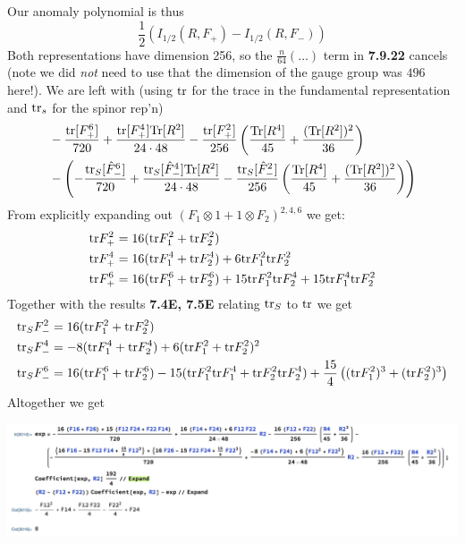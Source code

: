 \documentclass[11pt, class=article, crop=false]{standalone}
\begin{document}
\begin{enumerate}
	Our anomaly polynomial is thus
	\[
		\frac12 (I_{1/2}(R, F_+) - I_{1/2}(R, F_-))
	\]
	Both representations have dimension 256, so the $\frac{n}{64}(\dots)$ term in \textbf{7.9.22} cancels (note we did \emph{not} need to use that the dimension of the gauge group was $496$ here!). We are left with (using $\mathrm{tr}$ for the trace in the fundamental representation and $\mathrm{tr}_s$ for the spinor rep'n)
	\begin{equation}\label{eq:anomaly}
		\begin{aligned}
			&-\frac{\mathrm{tr}[F^6_+]}{720}+ \frac{\mathrm{tr}[F^4_+] \mathrm{Tr}[R^2]}{24 \cdot 48} - \frac{\mathrm{tr}[F^2_+]}{256} \left(\frac{\mathrm{Tr}[R^4]}{45} + \frac{(\mathrm{Tr}[R^2])^2}{36} \right)\\
			&-\left(-\frac{\mathrm{tr}_S[\hat F^6_-]}{720}+ \frac{\mathrm{tr}_S[\hat F^4_-] \mathrm{Tr}[R^2]}{24 \cdot 48} - \frac{\mathrm{tr}_S[\hat F^2_-]}{256} \left(\frac{\mathrm{Tr}[R^4]}{45} + \frac{(\mathrm{Tr}[R^2])^2}{36} \right) \right)
		\end{aligned}
	\end{equation}
	From explicitly expanding out $(F_1 \otimes 1 + 1\otimes F_2)^{2,4,6}$ we get:
	\[
	\begin{aligned}
		\mathrm{tr} F_+^2 &= 16 (\mathrm{tr} F_1^2 + \mathrm{tr} F_2^2) \\
		\mathrm{tr} F_+^4 &= 16 (\mathrm{tr} F_1^4 + \mathrm{tr} F_2^4) + 6 \mathrm{tr} F_1^2 \mathrm{tr} F_2^2 \\
		\mathrm{tr} F_+^6 &= 16 (\mathrm{tr} F_1^6 + \mathrm{tr} F_2^6) + 15 \mathrm{tr} F_1^2 \mathrm{tr} F_2^4 + 15 \mathrm{tr} F_1^4 \mathrm{tr} F_2^2
	\end{aligned}
	\]
	Together with the results \textbf{7.4E, 7.5E} relating $\mathrm{tr}_S$ to $\mathrm{tr}$ we get 
	\[
	\begin{aligned}
		\mathrm{tr}_S F_-^2 &= 16 (\mathrm{tr} F_1^2 + \mathrm{tr} F_2^2) \\
		\mathrm{tr}_S F_-^4 &= -8 (\mathrm{tr} F_1^4 + \mathrm{tr} F_2^4) + 6 (\mathrm{tr} F_1^2 + \mathrm{tr} F_2^2)^2 \\
		\mathrm{tr}_S F_-^6 &= 16 (\mathrm{tr} F_1^6 + \mathrm{tr} F_2^6) - 15 (\mathrm{tr} F_1^2 \mathrm{tr} F_1^4 + \mathrm{tr} F_2^2 \mathrm{tr} F_2^4) + \frac{15}{4} \left((\mathrm{tr} F_1^2)^3 + (\mathrm{tr} F_2^2)^3\right)
	\end{aligned}
	\]
	Altogether we get
	\begin{center}
		\includegraphics[scale=0.5]{"Figures/Anomaly Cancelation"}
	\end{center}
	


\end{enumerate}
\end{document}
